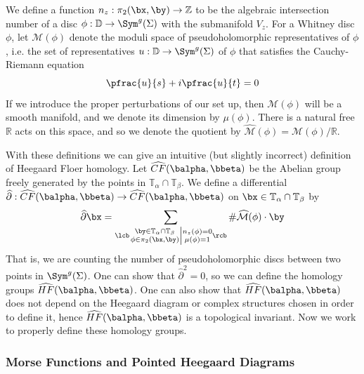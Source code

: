 We define a function $n_z : \pi_2(\bx,\by) \rightarrow \mathbb Z$ to be the algebraic intersection number of a disc $\phi : \mathbb D \rightarrow \Sym^g(\Sigma)$ with the submanifold $V_z$. For a Whitney disc $\phi$, let $\mathcal M(\phi)$ denote the moduli space of pseudoholomorphic representatives of $\phi$, i.e. the set of representatives $u : \mathbb D \rightarrow \Sym^g(\Sigma)$ of $\phi$ that satisfies the Cauchy-Riemann equation
\[ \pfrac{u}{s} + i \pfrac{u}{t} = 0 \]
If we introduce the proper perturbations of our set up, then $\mathcal M(\phi)$ will be a smooth manifold, and we denote its dimension by $\mu(\phi)$. There is a natural free $\mathbb R$ acts on this space, and so we denote the quotient by $\widehat{\mathcal M}(\phi) = \mathcal M(\phi) / \mathbb R$.

With these definitions we can give an intuitive (but slightly incorrect) definition of Heegaard Floer homology. Let $\widehat{CF}(\balpha,\bbeta)$ be the Abelian group freely generated by the points in $\mathbb T_\alpha \cap \mathbb T_\beta$. We define a differential $\widehat{\partial} : \widehat{CF}(\balpha,\bbeta) \rightarrow \widehat{CF}(\balpha,\bbeta)$ on $\bx \in \mathbb T_\alpha \cap \mathbb T_\beta$ by
\[ \widehat{\partial}\bx = \sum_{\lcb \left. \substack{\by \in \mathbb T_\alpha \cap \mathbb T_\beta \\ \phi \in \pi_2(\bx,\by)} \right| \substack{n_z(\phi)=0 \\ \mu(\phi)=1} \rcb} \# \widehat{\mathcal M}(\phi) \cdot \by \]
That is, we are counting the number of pseudoholomorphic discs between two points in $\Sym^g(\Sigma)$. One can show that $\widehat\partial^2 = 0$, so we can define the homology groups $\widehat{HF}(\balpha,\bbeta)$. One can also show that $\widehat{HF}(\balpha,\bbeta)$ does not depend on the Heegaard diagram or complex structures chosen in order to define it, hence $\widehat{HF}(\balpha,\bbeta)$ is a topological invariant. Now we work to properly define these homology groups. 

\subsubsection*{Morse Functions and Pointed Heegaard Diagrams}

